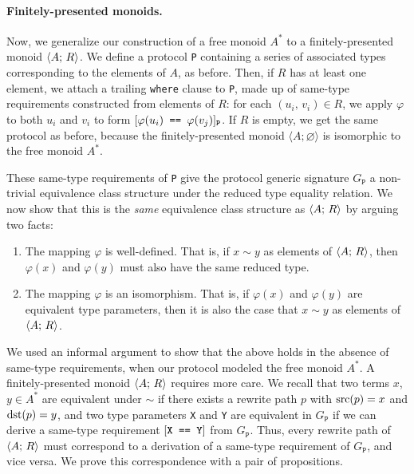 \documentclass[../generics]{subfiles}
\begin{document}
\paragraph{Finitely-presented monoids.}
Now, we generalize our construction of a free monoid $A^*$ to a finitely-presented monoid $\langle A;\,R\rangle$. We define a protocol \texttt{P} containing a series of associated types corresponding to the elements of $A$, as before. Then, if $R$ has at least one element, we attach a trailing \texttt{where} clause to \texttt{P}, made up of same-type requirements constructed from elements of $R$: for each $(u_i,\,v_i)\in R$, we apply $\varphi$ to both $u_i$ and $v_i$ to form $[\texttt{$\varphi(u_i)$ == $\varphi(v_j)$}]_\texttt{P}$. If $R$ is empty, we get the same protocol as before, because the finitely-presented monoid $\langle A;\varnothing\rangle$ is isomorphic to the free monoid $A^*$.

These same-type requirements of \texttt{P} give the protocol generic signature $G_\texttt{P}$ a non-trivial equivalence class structure under the reduced type equality relation. We now show that this is the \emph{same} equivalence class structure as $\langle A;\,R\rangle$ by arguing two facts:
\begin{enumerate}
\item The mapping $\varphi$ is well-defined. That is, if $x\sim y$ as elements of $\langle A;\,R\rangle$, then $\varphi(x)$ and $\varphi(y)$ must also have the same reduced type.
\item The mapping $\varphi$ is an isomorphism. That is, if $\varphi(x)$ and $\varphi(y)$ are equivalent type parameters, then it is also the case that $x\sim y$ as elements of $\langle A;\,R\rangle$.
\end{enumerate}
We used an informal argument to show that the above holds in the absence of same-type requirements, when our protocol modeled the free monoid $A^*$. A finitely-presented monoid $\langle A;\,R\rangle$ requires more care. We recall that two terms $x$, $y\in A^*$ are equivalent under $\sim$ if there exists a rewrite path $p$ with $\operatorname{src}(p)=x$ and $\operatorname{dst}(p)=y$, and two type parameters \texttt{X} and \texttt{Y} are equivalent in $G_\texttt{P}$ if we can derive a same-type requirement $[\texttt{X == Y}]$ from $G_\texttt{P}$. Thus, every rewrite path of $\langle A;\,R\rangle$ must correspond to a derivation of a same-type requirement of $G_\texttt{P}$, and vice versa. We prove this correspondence with a pair of propositions.
\end{document}
